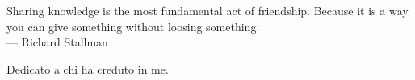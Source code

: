 
\cleardoublepage
{}
\thispagestyle{empty}

\vspace*{3cm}

\begin{center}
Sharing knowledge is the most fundamental act of friendship. Because it is a way you can give something without loosing something. \\ \medskip
--- Richard Stallman    
\end{center}

\medskip

\begin{center}
Dedicato a chi ha creduto in me.
\end{center}
